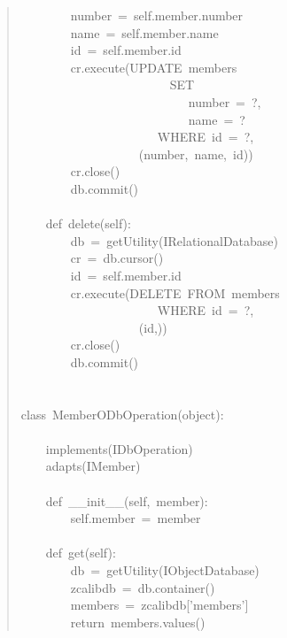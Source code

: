 \documentclass[14pt,a4paper,openany,twoside,final]{extbook}
\begin{document}
\begin{quote}
{~~~~~~~~number~=~self.member.number\\
~~~~~~~~name~=~self.member.name\\
~~~~~~~~id~=~self.member.id\\
~~~~~~~~cr.execute(\textquotedbl{}\textquotedbl{}\textquotedbl{}UPDATE~members\\
~~~~~~~~~~~~~~~~~~~~~~~~SET\\
~~~~~~~~~~~~~~~~~~~~~~~~~~~number~=~?,\\
~~~~~~~~~~~~~~~~~~~~~~~~~~~name~=~?\\
~~~~~~~~~~~~~~~~~~~~~~WHERE~id~=~?\textquotedbl{}\textquotedbl{}\textquotedbl{},\\
~~~~~~~~~~~~~~~~~~~(number,~name,~id))\\
~~~~~~~~cr.close()\\
~~~~~~~~db.commit()\\
~\\
~~~~def~delete(self):\\
~~~~~~~~db~=~getUtility(IRelationalDatabase)\\
~~~~~~~~cr~=~db.cursor()\\
~~~~~~~~id~=~self.member.id\\
~~~~~~~~cr.execute(\textquotedbl{}\textquotedbl{}\textquotedbl{}DELETE~FROM~members\\
~~~~~~~~~~~~~~~~~~~~~~WHERE~id~=~?\textquotedbl{}\textquotedbl{}\textquotedbl{},\\
~~~~~~~~~~~~~~~~~~~(id,))\\
~~~~~~~~cr.close()\\
~~~~~~~~db.commit()\\
~\\
~\\
class~MemberODbOperation(object):\\
~\\
~~~~implements(IDbOperation)\\
~~~~adapts(IMember)\\
~\\
~~~~def~\_\_init\_\_(self,~member):\\
~~~~~~~~self.member~=~member\\
~\\
~~~~def~get(self):\\
~~~~~~~~db~=~getUtility(IObjectDatabase)\\
~~~~~~~~zcalibdb~=~db.container()\\
~~~~~~~~members~=~zcalibdb{[}'members'{]}\\
~~~~~~~~return~members.values()\\
}
\end{quote}
\end{document}
